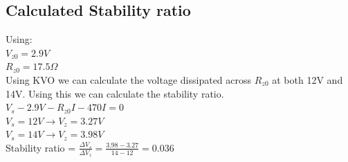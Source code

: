 \documentclass[a4paper,11pt]{article}
\begin{document}
\subsection{Calculated Stability ratio}
Using:\\
$V_{z0} = 2.9V$\\
$R_{z0} = 17.5 \Omega $\\

Using KVO we can calculate the voltage dissipated across $R_{z0}$ at both 12V and 14V. Using this we can calculate the stability ratio.\\
$V_{s}-2.9V-R_{z0}I-470I = 0$\\
$V_s = 12V \rightarrow V_z =3.27V$\\
$V_s = 14V \rightarrow V_z =3.98V$\\
Stability ratio = $\frac{\Delta V_s}{\Delta V_z} = \frac{3.98-3.27}{14-12} = 0.036$
\end{document}
